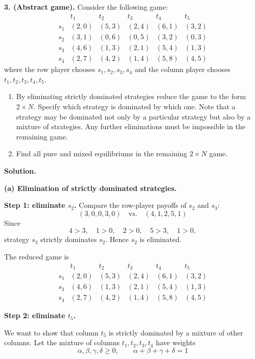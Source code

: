 \textbf{3. (Abstract game).}
Consider the following game:
\[
\begin{array}{c|ccccc}
 & t_1 & t_2 & t_3 & t_4 & t_5\\
\hline
s_1 & (2,0) & (5,3) & (2,4) & (6,1) & (3,2)\\
s_2 & (3,1) & (0,6) & (0,5) & (3,2) & (0,3)\\
s_3 & (4,6) & (1,3) & (2,1) & (5,4) & (1,3)\\
s_4 & (2,7) & (4,2) & (1,4) & (5,8) & (4,5)
\end{array}
\]
where the row player chooses \(s_1,s_2,s_3,s_4\) and the column player chooses \(t_1,t_2,t_3,t_4,t_5\).

\begin{enumerate}
\item[(a)]
By eliminating strictly dominated strategies reduce the game to the form \(2\times N\).
Specify which strategy is dominated by which one.
Note that a strategy may be dominated not only by a particular strategy but also by a mixture of strategies.
Any further eliminations must be impossible in the remaining game.

\item[(b)]
Find all pure and mixed equilibriums in the remaining \(2\times N\) game.
\end{enumerate}

\textbf{Solution.}

\textbf{(a) Elimination of strictly dominated strategies.}

\textbf{Step 1: eliminate \(s_2\).}
Compare the row-player payoffs of \(s_2\) and \(s_3\):
\[
(3,0,0,3,0) \quad \text{vs.} \quad (4,1,2,5,1)
\]
Since
\[
4>3,\quad 1>0,\quad 2>0,\quad 5>3,\quad 1>0,
\]
strategy \(s_3\) strictly dominates \(s_2\). Hence \(s_2\) is eliminated.

The reduced game is
\[
\begin{array}{c|ccccc}
 & t_1 & t_2 & t_3 & t_4 & t_5\\
\hline
s_1 & (2,0) & (5,3) & (2,4) & (6,1) & (3,2)\\
s_3 & (4,6) & (1,3) & (2,1) & (5,4) & (1,3)\\
s_4 & (2,7) & (4,2) & (1,4) & (5,8) & (4,5)
\end{array}
\]

\textbf{Step 2: eliminate \(t_5\).}

We want to show that column \(t_5\) is strictly dominated by a mixture of other columns.
Let the mixture of columns \(t_1, t_2, t_3, t_4\) have weights
\[
\alpha, \beta, \gamma, \delta \ge 0,
\qquad
\alpha + \beta + \gamma + \delta = 1
\]

